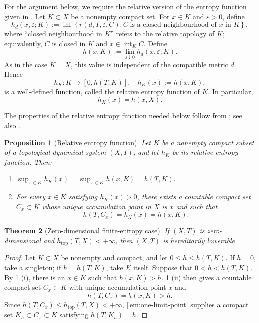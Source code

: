 \documentclass[12pt,letterpaper,reqno]{amsart}
\newcommand{\htop}{h_{\mathrm{top}}}
\newtheorem{theorem}{Theorem}[section]
\newtheorem{proposition}[theorem]{Proposition}
\theoremstyle{definition}
\theoremstyle{remark}
\numberwithin{equation}{section}
\begin{document}
	For the argument below, we require the relative version of the entropy
	function given in \cite[Remark~5.13]{YeZhang2007}. Let $K\subset X$ be a
	nonempty compact set. For $x\in K$ and $\varepsilon>0$, define
	\[
	h_d(x,\varepsilon;K)
	:=
	\inf
	\left\{
	r(d,T,\varepsilon,C):
	C\text{ is a closed neighbourhood of }x\text{ in }K
	\right\},
	\]
	where ``closed neighbourhood in $K$'' refers to the relative topology of
	$K$; equivalently, $C$ is closed in $K$ and
	$x\in\operatorname{int}_K C$. Define
	\begin{equation}
		h(x,K)
		:=
		\lim_{\varepsilon\downarrow0}
		h_d(x,\varepsilon;K).
		\label{eq:relative-entropy-function}
	\end{equation}
	As in the case $K=X$, this value is independent of the compatible metric
	$d$. Hence
	\[
	h_K\colon K\longrightarrow[0,h(T,K)],
	\quad
	h_K(x):=h(x,K),
	\]
	is a well-defined function, called the relative entropy function of $K$.
	In particular,
	\[
	h_X(x)=h(x,X).
	\]
	
	The properties of the relative entropy function needed below follow from
	\cite[Remark~5.13]{YeZhang2007}; see also
	\cite[Theorem~5.1]{HYZ2010}.
	
	\begin{proposition}[Relative entropy function]
		\label{prop:local-entropy}
		Let $K$ be a nonempty compact subset of a topological dynamical system
		$(X,T)$, and let $h_K$ be its relative entropy function. Then:
		\begin{enumerate}
			\item
			$\sup_{x\in K}h_K(x)
			=
			\sup_{x\in K}h(x,K)
			=
			h(T,K).$
			
			\item For every $x\in K$ satisfying $h_K(x)>0$, there exists a
			countable compact set $C_x\subset K$ whose unique accumulation point
			in $X$ is $x$ and such that
			\[
			h(T,C_x)=h_K(x)=h(x,K).
			\]
		\end{enumerate}
	\end{proposition}
	
	\begin{theorem}[Zero-dimensional finite-entropy case]
		\label{thm:zero-dimensional}
		If $(X,T)$ is zero-dimensional and $\htop(T,X)<+\infty$, then $(X,T)$ is
		hereditarily lowerable.
	\end{theorem}
	
	\begin{proof}
		Let $K\subset X$ be nonempty and compact, and let
		$0\leq h\leq h(T,K)$. If $h=0$, take a singleton; if $h=h(T,K)$, take $K$
		itself. Suppose that $0<h<h(T,K)$. By
		\cref{prop:local-entropy} (i), there is an $x\in K$ such that $h(x,K)>h$.
		\cref{prop:local-entropy} (ii) then gives a countable compact set $C_x\subset K$ with unique
		accumulation point $x$ and
		\[
		h(T,C_x)=h(x,K)>h.
		\]
		Since $h(T,C_x)\leq\htop(T,X)<+\infty$,
		\cref{lem:one-limit-point} supplies a compact set
		$K_h\subset C_x\subset K$ satisfying $h(T,K_h)=h$.
	\end{proof}
	
\end{document}
